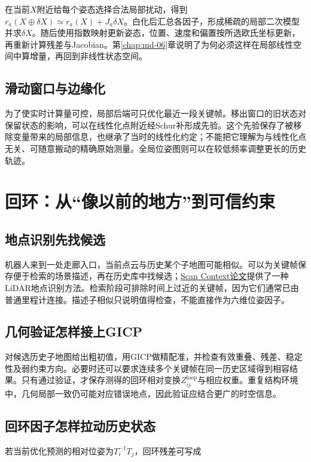 在当前$X$附近给每个姿态选择合法局部扰动，得到$r_a(X\oplus\delta X)\simeq r_a(X)+J_a\delta X$。白化后汇总各因子，形成稀疏的局部二次模型并求$\delta X$。随后使用指数映射更新姿态，位置、速度和偏置按所选欧氏坐标更新，再重新计算残差与Jacobian。第\ref{chap:md-06}章说明了为何必须这样在局部线性空间中算增量，再回到非线性状态空间。

\subsection{滑动窗口与边缘化}

为了使实时计算量可控，局部后端可只优化最近一段关键帧。移出窗口的旧状态对保留状态的影响，可以在线性化点附近经Schur补形成先验。这个先验保存了被移除变量带来的局部信息，也继承了当时的线性化约定；不能把它理解为与线性化点无关、可随意搬动的精确原始测量。全局位姿图则可以在较低频率调整更长的历史轨迹。

\section{回环：从“像以前的地方”到可信约束}

\subsection{地点识别先找候选}

机器人来到一处走廊入口，当前点云与历史某个子地图可能相似。可以为关键帧保存便于检索的场景描述，再在历史库中找候选；\href{https://arxiv.org/abs/1805.03465}{Scan Context论文}提供了一种LiDAR地点识别方法。检索阶段可排除时间上过近的关键帧，因为它们通常已由普通里程计连接。描述子相似只说明值得检查，不能直接作为六维位姿因子。

\subsection{几何验证怎样接上GICP}

对候选历史子地图给出粗初值，用GICP做精配准，并检查有效重叠、残差、稳定性及弱约束方向。必要时还可以要求连续多个关键帧在同一历史区域得到相容结果。只有通过验证，才保存测得的回环相对变换$Z_{ij}^{\mathrm{loop}}$与相应权重。重复结构环境中，几何局部一致仍可能对应错误地点，因此验证应结合更广的时空信息。

\subsection{回环因子怎样拉动历史状态}

若当前优化预测的相对位姿为$T_i^{-1}T_j$，回环残差可写成

